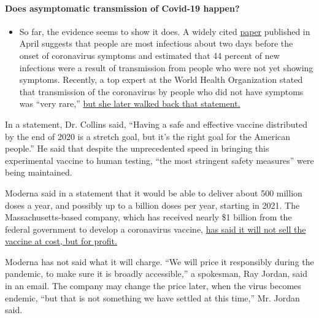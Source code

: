 \begin{itemize}
{  \paragraph{Does asymptomatic transmission of Covid-19
  happen?}\label{does-asymptomatic-transmission-of-covid-19-happen}}

  \begin{itemize}
  \tightlist
  \item
    So far, the evidence seems to show it does. A widely cited
    \href{https://www.nature.com/articles/s41591-020-0869-5}{paper}
    published in April suggests that people are most infectious about
    two days before the onset of coronavirus symptoms and estimated that
    44 percent of new infections were a result of transmission from
    people who were not yet showing symptoms. Recently, a top expert at
    the World Health Organization stated that transmission of the
    coronavirus by people who did not have symptoms was ``very rare,''
    \href{https://www.nytimes3xbfgragh.onion/2020/06/09/world/coronavirus-updates.html?action=click\&pgtype=Article\&state=default\&region=MAIN_CONTENT_3\&context=storylines_faq\#link-1f302e21}{but
    she later walked back that statement.}
  \end{itemize}
\end{itemize}

In a statement, Dr. Collins said, ``Having a safe and effective vaccine
distributed by the end of 2020 is a stretch goal, but it's the right
goal for the American people.'' He said that despite the unprecedented
speed in bringing this experimental vaccine to human testing, ``the most
stringent safety measures'' were being maintained.

Moderna said in a statement that it would be able to deliver about 500
million doses a year, and possibly up to a billion doses per year,
starting in 2021. The Massachusetts-based company, which has received
nearly \$1 billion from the federal government to develop a coronavirus
vaccine,
\href{https://www.nytimes3xbfgragh.onion/2020/07/21/health/covid-19-vaccine-coronavirus-moderna-pfizer.html}{has
said it will not sell the vaccine at cost, but for profit.}

Moderna has not said what it will charge. ``We will price it responsibly
during the pandemic, to make sure it is broadly accessible,'' a
spokesman, Ray Jordan, said in an email. The company may change the
price later, when the virus becomes endemic, ``but that is not something
we have settled at this time,'' Mr. Jordan said.

